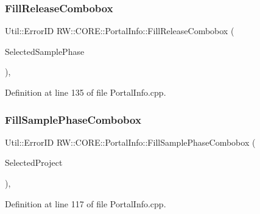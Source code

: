 \hypertarget{class_r_w_1_1_c_o_r_e_1_1_portal_info_ad9f44cdba6c3c3aa901e45d8a503c13f}{}\label{class_r_w_1_1_c_o_r_e_1_1_portal_info_ad9f44cdba6c3c3aa901e45d8a503c13f} 
\subsubsection{\texorpdfstring{Fill\+Release\+Combobox}{FillReleaseCombobox}}
{\footnotesize\ttfamily Util\+::\+Error\+ID R\+W\+::\+C\+O\+R\+E\+::\+Portal\+Info\+::\+Fill\+Release\+Combobox (\begin{DoxyParamCaption}\item[{const Q\+String \&}]{Selected\+Sample\+Phase }\end{DoxyParamCaption})\hspace{0.3cm}{\ttfamily [private]}, {\ttfamily [slot]}}



Definition at line 135 of file Portal\+Info.\+cpp.

\hypertarget{class_r_w_1_1_c_o_r_e_1_1_portal_info_a3f22e04d628d3907cff56e3617dda192}{}\label{class_r_w_1_1_c_o_r_e_1_1_portal_info_a3f22e04d628d3907cff56e3617dda192} 
\subsubsection{\texorpdfstring{Fill\+Sample\+Phase\+Combobox}{FillSamplePhaseCombobox}}
{\footnotesize\ttfamily Util\+::\+Error\+ID R\+W\+::\+C\+O\+R\+E\+::\+Portal\+Info\+::\+Fill\+Sample\+Phase\+Combobox (\begin{DoxyParamCaption}\item[{const Q\+String \&}]{Selected\+Project }\end{DoxyParamCaption})\hspace{0.3cm}{\ttfamily [private]}, {\ttfamily [slot]}}



Definition at line 117 of file Portal\+Info.\+cpp.

